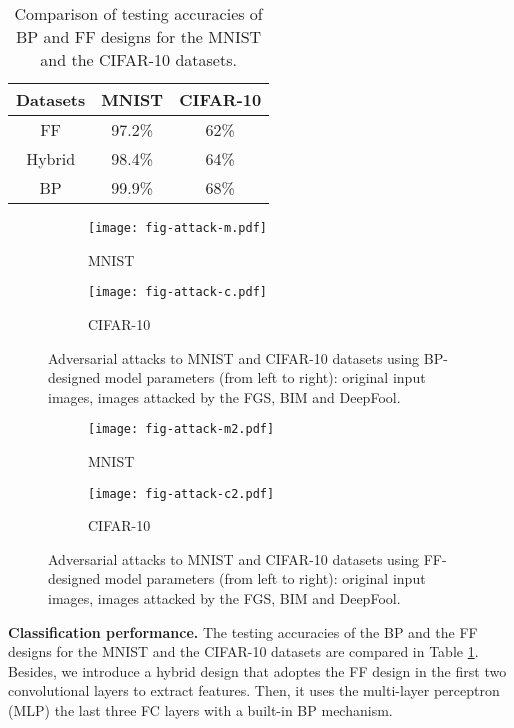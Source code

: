 \documentclass[preprint,12pt]{elsarticle}
\begin{document}
\begin{table}[htb]
\begin{center}
\begin{tabular}{|c|c|c|} \hline
Datasets  &     MNIST   & CIFAR-10  \\ \hline
FF        &    97.2\%  &  62\%  \\ \hline
Hybrid    &    98.4\%  &  64\%  \\ \hline
BP        &    99.9\%  &  68\%  \\ \hline
\end{tabular}
\end{center}
\caption{Comparison of testing accuracies of BP and FF designs
for the MNIST and the CIFAR-10 datasets.}\label{table:classification}
\end{table}

\begin{figure}[htb]
\centering
\begin{subfigure}[b]{0.4\linewidth}
\centering
\texttt{[image: fig-attack-m.pdf]}
\caption{MNIST}
\end{subfigure}
\begin{subfigure}[b]{0.4\linewidth}
\centering
\texttt{[image: fig-attack-c.pdf]}
\caption{CIFAR-10}
\end{subfigure}
\caption{Adversarial attacks to MNIST and CIFAR-10 datasets using
BP-designed model parameters (from left to right): original input
images, images attacked by the FGS, BIM and DeepFool.}\label{fig:attack}
\end{figure}

\begin{figure}[htb]
\centering
\begin{subfigure}[b]{0.4\linewidth}
\centering
\texttt{[image: fig-attack-m2.pdf]}
\caption{MNIST}
\end{subfigure}
\begin{subfigure}[b]{0.4\linewidth}
\centering
\texttt{[image: fig-attack-c2.pdf]}
\caption{CIFAR-10}
\end{subfigure}
\caption{Adversarial attacks to MNIST and CIFAR-10 datasets using
FF-designed model parameters (from left to right): original input
images, images attacked by the FGS, BIM and
DeepFool.}\label{fig:attack-2}
\end{figure}

{\bf Classification performance.} The testing accuracies of the BP and
the FF designs for the MNIST and the CIFAR-10 datasets are compared in
Table \ref{table:classification}. Besides, we introduce a hybrid design
that adoptes the FF design in the first two convolutional layers to
extract features. Then, it uses the multi-layer perceptron (MLP) the
last three FC layers with a built-in BP mechanism. 
\end{document}
